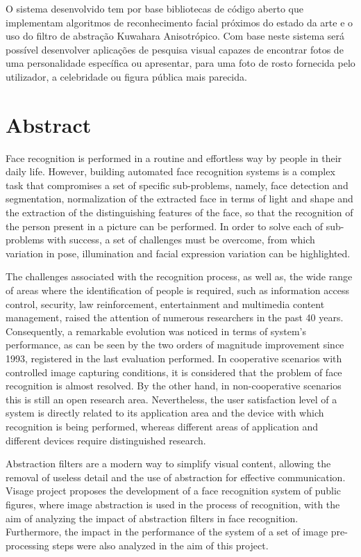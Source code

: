 O sistema desenvolvido tem por base bibliotecas de código aberto que implementam algoritmos de reconhecimento facial próximos do estado da arte e o uso do filtro de abstração Kuwahara Anisotrópico. Com base neste sistema será possível desenvolver aplicações de pesquisa visual capazes de encontrar fotos de uma personalidade específica ou apresentar, para uma foto de rosto fornecida pelo utilizador, a celebridade ou figura pública mais parecida.

\chapter*{Abstract}
Face recognition is performed in a routine and effortless way by people in their daily life. However, building automated face recognition systems is a complex task that compromises a set of specific sub-problems, namely, face detection and segmentation, normalization of the extracted face in terms of light and shape and the extraction of the distinguishing features of the face, so that the recognition of the person present in a picture can be performed. In order to solve each of sub-problems with success, a set of challenges must be overcome, from which variation in pose, illumination and facial expression variation can be highlighted.

The challenges associated with the recognition process, as well as, the wide range of areas where the identification of people is required, such as information access control, security, law reinforcement, entertainment and multimedia content management, raised the attention of numerous researchers in the past 40 years. Consequently, a remarkable evolution was noticed in terms of system's performance, as can be seen by the two orders of magnitude improvement since 1993, registered in the last evaluation performed. In cooperative scenarios with controlled image capturing conditions, it is considered that the problem of face recognition is almost resolved. By the other hand,  in non-cooperative scenarios this is still an open research area. Nevertheless, the user satisfaction level of a system is directly related to its application area and the device with which recognition is being performed, whereas different areas of application and different devices require distinguished research.

Abstraction filters are a modern way to simplify visual content, allowing the removal of useless detail and the use of abstraction for effective communication. Visage project proposes the development of a face recognition system of public figures, where image abstraction is used in the process of recognition, with the aim of analyzing the impact of abstraction filters in face recognition. Furthermore, the impact in the performance of the system of a set of image pre-processing steps were also analyzed in the aim of this project.

